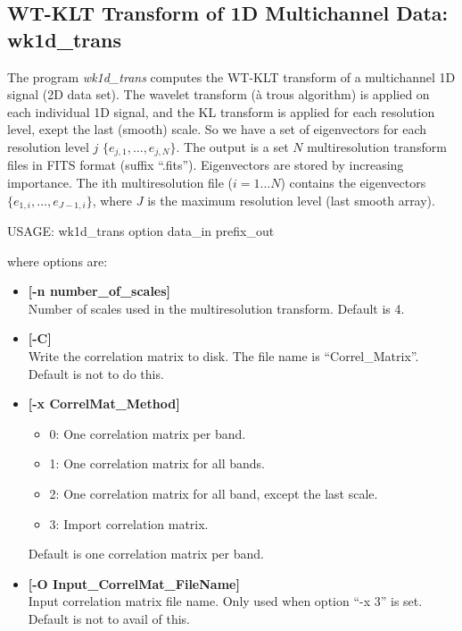 \subsection{WT-KLT Transform of 1D Multichannel Data: wk1d\_trans}
\label{sect_mc1d_trans}
The program 
{\em wk1d\_trans} computes the WT-KLT  transform of 
a multichannel 1D signal (2D data set). 
The wavelet transform (\`a trous algorithm)
is applied on each individual 1D signal, and the KL transform is applied for
each resolution level, exept the last (smooth) scale. 
So we have a set of eigenvectors for 
each resolution level $j$ $\{e_{j,1}, \dots, e_{j,N}\}$.
The output is a set 
$N$ multiresolution transform files in FITS format (suffix ``.fits''). 
Eigenvectors
are stored by increasing importance. The ith multiresolution file 
($i = 1 \dots N$)
contains the eigenvectors $\{e_{1,i}, \dots, e_{J-1,i}\}$, where $J$ is the 
maximum resolution level (last smooth array).
{\bf
\begin{center}
 USAGE: wk1d\_trans option data\_in prefix\_out
\end{center}}
where options are: 
\begin{itemize} 
\baselineskip=0.4truecm
 \item {\bf [-n number\_of\_scales]} \\
 Number of scales used in the multiresolution transform.
 Default is 4.
\item {\bf [-C]} \\
Write the correlation matrix to disk. 
The file name is ``Correl\_Matrix''. Default is not to do this.
\item {\bf [-x CorrelMat\_Method]}
{\small
\begin{itemize}             
\item{0:} One correlation matrix per band. 
\item{1:} One correlation matrix for all bands. 
\item{2:} One correlation matrix for all band, except the last scale. 
\item{3:} Import correlation matrix.
\end{itemize}
Default is one correlation matrix per band.
}             
\item {\bf [-O Input\_CorrelMat\_FileName]} \\
Input correlation matrix file name.
Only used when option ``-x 3'' is set. Default is not to avail of this.
\end{itemize}

